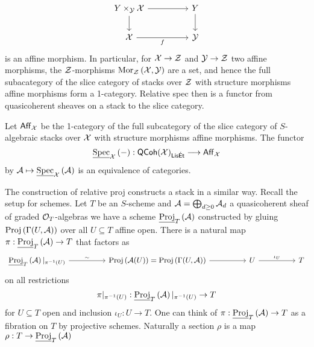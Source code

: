 $$%
    \begin{tikzcd}
        {Y\times_{\Ycal}\Xcal} && Y \\
        \Xcal && \Ycal
        \arrow["f"', from=2-1, to=2-3]
        \arrow[from=1-3, to=2-3]
        \arrow[from=1-1, to=2-1]
        \arrow[from=1-1, to=1-3]
    \end{tikzcd}$$
is an affine morphism. In particular, for $\mathcal{X}\to\mathcal{Z}$ and $\mathcal{Y}\to\mathcal{Z}$ two affine morphisms, the $\mathcal{Z}$-morphisms $\mathrm{Mor}_{\mathcal{Z}}\left(\mathcal{X},\mathcal{Y}\right)$ are a set, and hence the full subacategory of the slice category of stacks over $\mathcal{Z}$ with structure morphisms affine morphisms form a 1-category. Relative spec then is a functor from quasicoherent sheaves on a stack to the slice category. 
\begin{proposition}
    Let $\mathsf{Aff}_{\mathcal{X}}$ be the 1-category of the full subcategory of the slice category of $S$-algebraic stacks over $\mathcal{X}$ with structure morphisms affine morphisms. The functor 
    $$\operatorname{\underline{Spec}}_{\mathcal{X}}\left(-\right):\mathsf{QCoh}(\mathcal{X})_{\mathsf{Lis\acute{E}t}}\longrightarrow\mathsf{Aff}_{\mathcal{X}}$$
    by $\mathcal{A}\mapsto\operatorname{\underline{Spec}}_{\mathcal{X}}\left(\mathcal{A}\right)$ is an equivalence of categories. 
\end{proposition}
The construction of relative proj constructs a stack in a similar way. Recall the setup for schemes. Let $T$ be an $S$-scheme and $\mathcal{A}=\bigoplus_{d\geq0}\mathcal{A}_{d}$ a quasicoherent sheaf of graded $\mathcal{O}_{T}$-algebras we have a scheme $\operatorname{\underline{Proj}}_{T}\left(\mathcal{A}\right)$ constructed by gluing $\operatorname{Proj}\left(\Gamma(U,\mathcal{A})\right)$ over all $U\subseteq T$ affine open. There is a natural map $\pi:\operatorname{\underline{Proj}}_{T}\left(\mathcal{A}\right)\to T$ that factors as 
$$%
\begin{tikzcd}
	{\relProj_{T}\left(\Acal\right)|_{\pi^{-1}(U)}} && {\proj\left(\Acal(U)\right)=\proj\left(\Gamma(U,\Acal)\right)} && U && T
	\arrow["{\iota_{U}}", from=1-5, to=1-7]
	\arrow[from=1-3, to=1-5]
	\arrow["\sim", from=1-1, to=1-3]
\end{tikzcd}$$
on all restrictions 
$$\pi|_{\pi^{-1}(U)}:\operatorname{\underline{Proj}}_{T}\left(\mathcal{A}\right)|_{\pi^{-1}(U)}\to T$$
for $U\subseteq T$ open and inclusion $\iota_{U}:U\to T$. One can think of $\pi:\operatorname{\underline{Proj}}_{T}\left(\mathcal{A}\right)\to T$ as a fibration on $T$ by projective schemes. Naturally a section $\rho$ is a map $\rho:T\to\operatorname{\underline{Proj}}_{T}\left(\mathcal{A}\right)$
